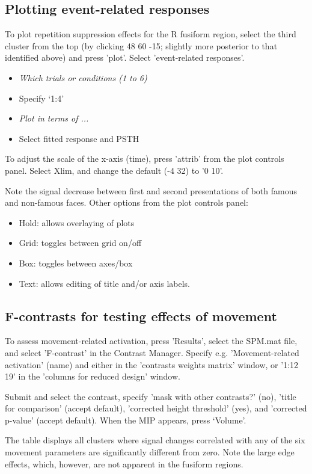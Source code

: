 \documentclass[a4paper,titlepage]{book}
\newcommand{\bi}{\begin{itemize}}
\newcommand{\ei}{\end{itemize}}
\begin{document}
\subsection{Plotting event-related responses}

To plot repetition suppression effects for the R fusiform region, select the third cluster from the top (by clicking 48 60 -15; slightly more posterior to that identified above) and press 'plot'.
Select  'event-related responses'.
\bi
\item{\em Which trials or conditions (1 to 6)}
\item{Specify `1:4'}
\item{\em Plot in terms of ...}
\item{Select fitted response and PSTH}
\ei
To adjust the scale of the x-axis (time), press 'attrib' from the plot controls panel.
Select Xlim, and change the default (-4 32) to '0 10'.

Note the signal decrease between first and second presentations of both famous and non-famous faces.
Other options from the plot controls panel:
\bi
\item{Hold: allows overlaying of plots}
\item{Grid: toggles between grid on/off}
\item{Box: toggles between axes/box}
\item{Text: allows editing of title and/or axis labels.}
\ei

\subsection{F-contrasts for testing effects of movement}

To assess movement-related activation, press 'Results', select the SPM.mat file, and select 'F-contrast' in the Contrast Manager. Specify e.g. 'Movement-related activation' (name) and either {}
in the 'contrasts weights matrix' window, or '1:12 19' in the 'columns for reduced design' window. 
 
Submit and select the contrast, specify 'mask with other contrasts?' (no), 'title for comparison' (accept default), 'corrected height threshold' (yes), and 'corrected p-value' (accept default). When the MIP appears, press `Volume'.

The table displays all clusters where signal changes correlated with any of the six movement parameters are significantly different from zero. Note the large edge effects, which, however, are not apparent in the fusiform regions.
\end{document}
